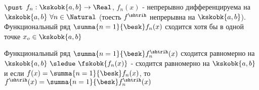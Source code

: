\begin{proofs}
		$\pust$ $f_n: \kskobk{a,b} \to \Real$, $f_n(x)$ - непрерывно дифференцируема на $\kskobk{a,b} \ \forall n \in \Natural$ (тоесть $f^{\shtrih}$ непрерывна на $\kskobk{a,b}$). Функциональный ряд $\summa{n=1}{\besk}f_n(x)$ сходится хотя бы в одной точке $x_o \in \kskobk{a,b}$

		Функциональный ряд $\summa{n=1}{\besk}f^{\shtrih}_{n}(x)$ сходится равномерно на $\kskobk{a,b} \ \sledue \ \fskobk{f_n(x)}$ - сходится равномерно на $\kskobk{a,b}$ и если $f(x) = \summa{n=1}{\besk}f_n(x)$, то $f^{\shtrih}(x)= \summa{n=1}{\besk}f_{n}^{\shtrih}(x)$
\end{proofs}
\newpage
